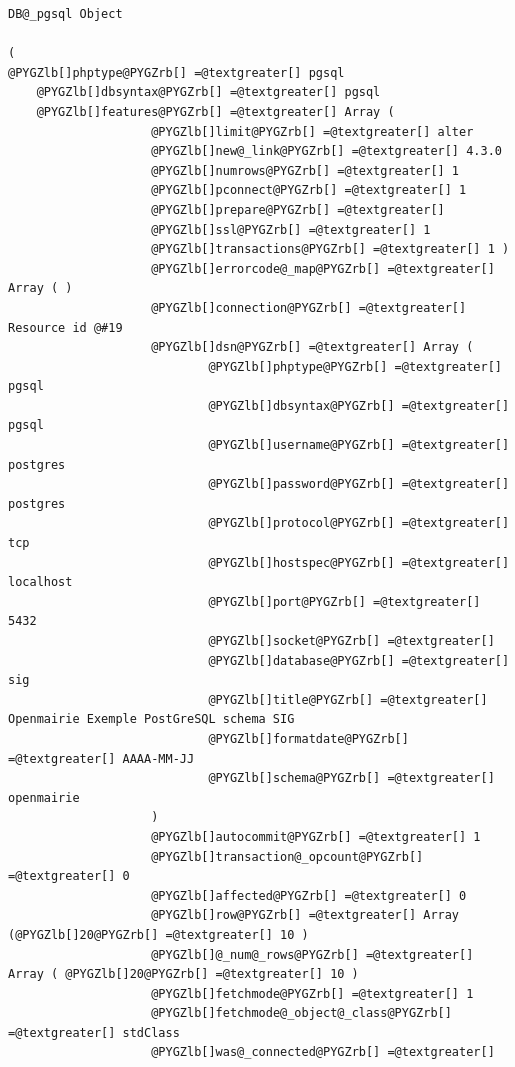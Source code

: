 \documentclass[letterpaper,10pt,french]{manual}
\begin{document}
\begin{Verbatim}[commandchars=@\[\]]
DB@_pgsql Object

(
@PYGZlb[]phptype@PYGZrb[] =@textgreater[] pgsql
    @PYGZlb[]dbsyntax@PYGZrb[] =@textgreater[] pgsql
    @PYGZlb[]features@PYGZrb[] =@textgreater[] Array (
                    @PYGZlb[]limit@PYGZrb[] =@textgreater[] alter
                    @PYGZlb[]new@_link@PYGZrb[] =@textgreater[] 4.3.0
                    @PYGZlb[]numrows@PYGZrb[] =@textgreater[] 1
                    @PYGZlb[]pconnect@PYGZrb[] =@textgreater[] 1
                    @PYGZlb[]prepare@PYGZrb[] =@textgreater[]
                    @PYGZlb[]ssl@PYGZrb[] =@textgreater[] 1
                    @PYGZlb[]transactions@PYGZrb[] =@textgreater[] 1 )
                    @PYGZlb[]errorcode@_map@PYGZrb[] =@textgreater[] Array ( )
                    @PYGZlb[]connection@PYGZrb[] =@textgreater[] Resource id @#19
                    @PYGZlb[]dsn@PYGZrb[] =@textgreater[] Array (
                            @PYGZlb[]phptype@PYGZrb[] =@textgreater[] pgsql
                            @PYGZlb[]dbsyntax@PYGZrb[] =@textgreater[] pgsql
                            @PYGZlb[]username@PYGZrb[] =@textgreater[] postgres
                            @PYGZlb[]password@PYGZrb[] =@textgreater[] postgres
                            @PYGZlb[]protocol@PYGZrb[] =@textgreater[] tcp
                            @PYGZlb[]hostspec@PYGZrb[] =@textgreater[] localhost
                            @PYGZlb[]port@PYGZrb[] =@textgreater[] 5432
                            @PYGZlb[]socket@PYGZrb[] =@textgreater[]
                            @PYGZlb[]database@PYGZrb[] =@textgreater[] sig
                            @PYGZlb[]title@PYGZrb[] =@textgreater[] Openmairie Exemple PostGreSQL schema SIG
                            @PYGZlb[]formatdate@PYGZrb[] =@textgreater[] AAAA-MM-JJ
                            @PYGZlb[]schema@PYGZrb[] =@textgreater[] openmairie
                    )
                    @PYGZlb[]autocommit@PYGZrb[] =@textgreater[] 1
                    @PYGZlb[]transaction@_opcount@PYGZrb[] =@textgreater[] 0
                    @PYGZlb[]affected@PYGZrb[] =@textgreater[] 0
                    @PYGZlb[]row@PYGZrb[] =@textgreater[] Array (@PYGZlb[]20@PYGZrb[] =@textgreater[] 10 )
                    @PYGZlb[]@_num@_rows@PYGZrb[] =@textgreater[] Array ( @PYGZlb[]20@PYGZrb[] =@textgreater[] 10 )
                    @PYGZlb[]fetchmode@PYGZrb[] =@textgreater[] 1
                    @PYGZlb[]fetchmode@_object@_class@PYGZrb[] =@textgreater[] stdClass
                    @PYGZlb[]was@_connected@PYGZrb[] =@textgreater[]

\end{Verbatim}
\end{document}

